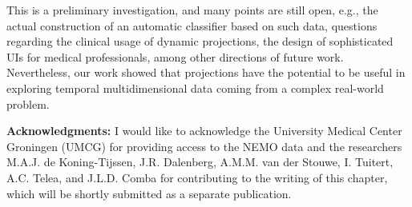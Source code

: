 This is a preliminary investigation, and many points are still open, e.g., the actual construction of an automatic classifier based on such data, questions regarding the clinical usage of dynamic projections, the design of sophisticated UIs for medical professionals, among other directions of future work. Nevertheless, our work showed that projections have the potential to be useful in exploring temporal multidimensional data coming from a complex real-world problem.

\vspace{5mm} %

\noindent\textbf{Acknowledgments:} I would like to acknowledge the University Medical Center Groningen (UMCG) for providing access to the NEMO data and the researchers M.A.J. de Koning-Tijssen, J.R. Dalenberg, A.M.M. van der Stouwe, I. Tuitert, A.C. Telea, and J.L.D. Comba for contributing to the writing of this chapter, which will be shortly submitted as a separate publication.
